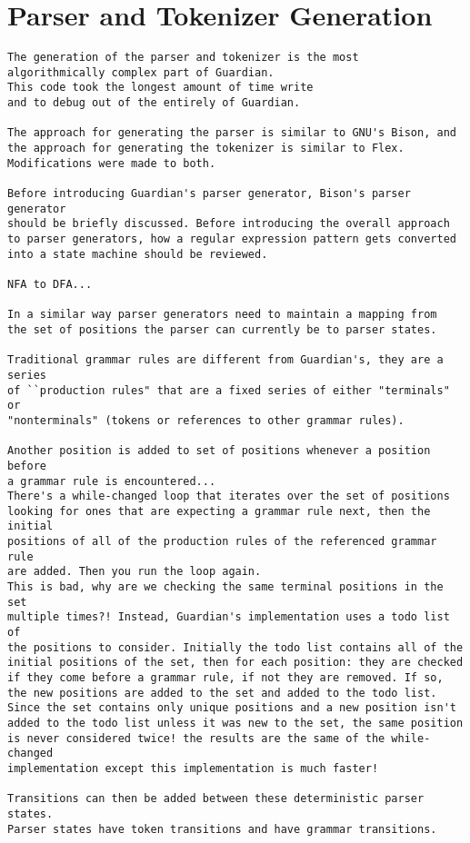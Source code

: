 
\section{Parser and Tokenizer Generation}
{
\begin{verbatim}
The generation of the parser and tokenizer is the most
algorithmically complex part of Guardian.
This code took the longest amount of time write
and to debug out of the entirely of Guardian.

The approach for generating the parser is similar to GNU's Bison, and
the approach for generating the tokenizer is similar to Flex.
Modifications were made to both.

Before introducing Guardian's parser generator, Bison's parser generator
should be briefly discussed. Before introducing the overall approach
to parser generators, how a regular expression pattern gets converted
into a state machine should be reviewed.

NFA to DFA...

In a similar way parser generators need to maintain a mapping from
the set of positions the parser can currently be to parser states.

Traditional grammar rules are different from Guardian's, they are a series
of ``production rules" that are a fixed series of either "terminals" or
"nonterminals" (tokens or references to other grammar rules).

Another position is added to set of positions whenever a position before
a grammar rule is encountered...
There's a while-changed loop that iterates over the set of positions
looking for ones that are expecting a grammar rule next, then the initial
positions of all of the production rules of the referenced grammar rule
are added. Then you run the loop again.
This is bad, why are we checking the same terminal positions in the set
multiple times?! Instead, Guardian's implementation uses a todo list of
the positions to consider. Initially the todo list contains all of the
initial positions of the set, then for each position: they are checked
if they come before a grammar rule, if not they are removed. If so,
the new positions are added to the set and added to the todo list.
Since the set contains only unique positions and a new position isn't
added to the todo list unless it was new to the set, the same position
is never considered twice! the results are the same of the while-changed
implementation except this implementation is much faster!

Transitions can then be added between these deterministic parser states.
Parser states have token transitions and have grammar transitions.


\end{verbatim}}
